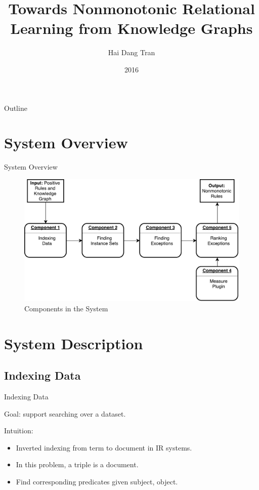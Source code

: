\documentclass{beamer}
\title{Towards Nonmonotonic Relational Learning from Knowledge Graphs}
\subtitle{}
\author{Hai Dang Tran\inst{1}}
\institute[Max Planck Institute for Informatics] %
{
  \inst{1}%
  Saarland University\\
  Max Planck Institute for Informatics
}
\date{2016}
\begin{document}
\begin{frame}
  \titlepage
\end{frame}

\begin{frame}{Outline}
  \tableofcontents
\end{frame}

\section{System Overview}

\begin{frame}{System Overview}

\begin{figure}[h]
	\centering
	\includegraphics[page=1,width=.75\textwidth]{overview.pdf}
	\caption{Components in the System}
\end{figure}

\end{frame}

\section{System Description}

\subsection{Indexing Data}

\begin{frame}{Indexing Data}

Goal: support searching over a dataset.

Intuition:
\begin{itemize}
	\item Inverted indexing from term to document in IR systems.
  	\item In this problem, a triple is a document.
  	\item Find corresponding predicates given subject, object.
\end{itemize}

\end{frame}
\end{document}
